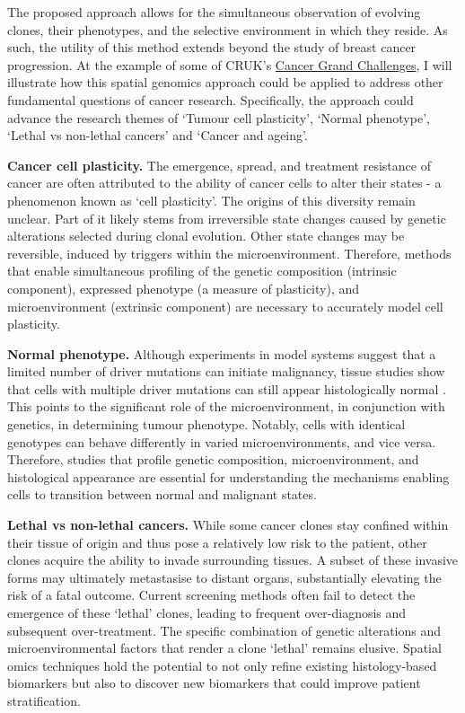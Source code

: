 The proposed approach allows for the simultaneous observation of evolving clones, their phenotypes, and the selective environment in which they reside. As such, the utility of this method extends beyond the study of breast cancer progression. At the example of some of CRUK's \href{https://cancergrandchallenges.org/}{Cancer Grand Challenges}, I will illustrate how this spatial genomics approach could be applied to address other fundamental questions of cancer research. Specifically, the approach could advance the research themes of `Tumour cell plasticity', `Normal phenotype', `Lethal vs non-lethal cancers' and `Cancer and ageing'.

\textbf{Cancer cell plasticity.} The emergence, spread, and treatment resistance of cancer are often attributed to the ability of cancer cells to alter their states - a phenomenon known as `cell plasticity'. The origins of this diversity remain unclear. Part of it likely stems from irreversible state changes caused by genetic alterations selected during clonal evolution. Other state changes may be reversible, induced by triggers within the microenvironment. Therefore, methods that enable simultaneous profiling of the genetic composition (intrinsic component), expressed phenotype (a measure of plasticity), and microenvironment (extrinsic component) are necessary to accurately model cell plasticity.


\textbf{Normal phenotype.} Although experiments in model systems suggest that a limited number of driver mutations can initiate malignancy, tissue studies show that cells with multiple driver mutations can still appear histologically normal . This points to the significant role of the microenvironment, in conjunction with genetics, in determining tumour phenotype. Notably, cells with identical genotypes can behave differently in varied microenvironments, and vice versa. Therefore, studies that profile genetic composition, microenvironment, and histological appearance are essential for understanding the mechanisms enabling cells to transition between normal and malignant states.

\textbf{Lethal vs non-lethal cancers.} While some cancer clones stay confined within their tissue of origin and thus pose a relatively low risk to the patient, other clones acquire the ability to invade surrounding tissues. A subset of these invasive forms may ultimately metastasise to distant organs, substantially elevating the risk of a fatal outcome. Current screening methods often fail to detect the emergence of these `lethal' clones, leading to frequent over-diagnosis and subsequent over-treatment. The specific combination of genetic alterations and microenvironmental factors that render a clone `lethal' remains elusive. Spatial omics techniques hold the potential to not only refine existing histology-based biomarkers but also to discover new biomarkers that could improve patient stratification.

